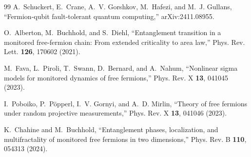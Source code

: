 \documentclass[aps,prl,twocolumn,floatfix,superscriptaddress,nofootinbib]{revtex4-2}
\begin{document}
\begin{thebibliography}{99}
A.~Schuckert, E.~Crane, A.~V. Gorshkov, M.~Hafezi, and M.~J. Gullans,
``Fermion-qubit fault-tolerant quantum computing,''
arXiv:2411.08955.

O.~Alberton, M.~Buchhold, and S.~Diehl,
``Entanglement transition in a monitored free-fermion chain: From extended criticality to area law,''
Phys. Rev. Lett. \textbf{126}, 170602 (2021).

M.~Fava, L.~Piroli, T.~Swann, D.~Bernard, and A.~Nahum,
``Nonlinear sigma models for monitored dynamics of free fermions,''
Phys. Rev. X \textbf{13}, 041045 (2023).

I.~Poboiko, P.~P\"opperl, I.~V. Gornyi, and A.~D. Mirlin,
``Theory of free fermions under random projective measurements,''
Phys. Rev. X \textbf{13}, 041046 (2023).

K.~Chahine and M.~Buchhold,
``Entanglement phases, localization, and multifractality of monitored free fermions in two dimensions,''
Phys. Rev. B \textbf{110}, 054313 (2024).

\end{thebibliography}
\end{document}
